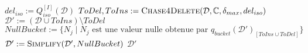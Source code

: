 \begin{algorithm}[ht]
    \caption{$\textsc{Delete}(\mathcal{D}, \mathbb{C}, \delta_{max}, I)$}
    \label{algo:update:delete}
    $del_{iso} := Q_{iso}^{[I]}(\mathcal{D})$ \;
    $ToDel, ToIns := \textsc{Chase4Delete} (\mathcal{D}, \mathbb{C}, \delta_{max}, del_{iso})$\;
    $\mathcal{D}' := (\mathcal{D} \cup ToIns) \setminus ToDel$ \;
    $NullBucket := \{N_j \mid N_j \text{ est une valeur nulle obtenue par } q_{bucket}(\mathcal{D}')_{[ToIns \cup ToDel]}\}$ \;
    $\mathcal{D}' := \textsc{Simplify}(\mathcal{D}', NullBucket)$ \;
    \Return $\mathcal{D}'$
\end{algorithm}

\begin{example}

\end{example}

